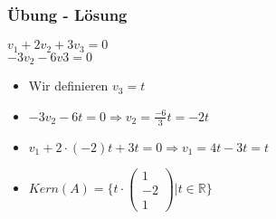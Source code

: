\begin{frame}
    \frametitle{Übung - Lösung}
	$v_1 + 2v_2 + 3v_3 = 0$ \\
	$-3v_2 -6v3 = 0$
    \begin{itemize}
        \item Wir definieren $v_3 = t$
		\item $-3v_2 -6t = 0 \Rightarrow v_2 = \frac{-6}{3}t = -2t$
		\item $v_1 + 2 \cdot (-2)t + 3t = 0 \Rightarrow v_1 = 4t - 3t = t$
		\item $Kern(A) = \{t \cdot \begin{pmatrix}1 \\ -2 \\ 1 \end{pmatrix} | t \in \mathbb{R}\}$
    \end{itemize}
\end{frame}